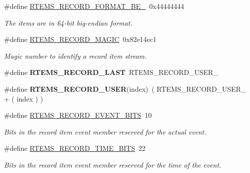 \begin{DoxyCompactItemize}
\mbox{\label{group__RTEMSRecord_ga299229d8ddf07f89328eac448152d11a}} 
\#define \mbox{\hyperlink{group__RTEMSRecord_ga299229d8ddf07f89328eac448152d11a}{R\+T\+E\+M\+S\+\_\+\+R\+E\+C\+O\+R\+D\+\_\+\+F\+O\+R\+M\+A\+T\+\_\+\+B\+E\+\_}}~0x44444444
\begin{DoxyCompactList}\small\item\em The items are in 64-\/bit big-\/endian format. \end{DoxyCompactList}\item 
\#define \mbox{\hyperlink{group__RTEMSRecord_ga6d42a7b92bb26f015d34d5d1a84ebbe5}{R\+T\+E\+M\+S\+\_\+\+R\+E\+C\+O\+R\+D\+\_\+\+M\+A\+G\+IC}}~0x82e14ec1
\begin{DoxyCompactList}\small\item\em Magic number to identify a record item stream. \end{DoxyCompactList}\item 
\mbox{\label{group__RTEMSRecord_ga101d568a23f52cb8dabf7e3744d6ad5e}} 
\#define {\bfseries R\+T\+E\+M\+S\+\_\+\+R\+E\+C\+O\+R\+D\+\_\+\+L\+A\+ST}~R\+T\+E\+M\+S\+\_\+\+R\+E\+C\+O\+R\+D\+\_\+\+U\+S\+E\+R\+\_
\item 
\mbox{\label{group__RTEMSRecord_ga61432a1351e8b62da02ebd52232ab1a3}} 
\#define {\bfseries R\+T\+E\+M\+S\+\_\+\+R\+E\+C\+O\+R\+D\+\_\+\+U\+S\+ER}(index)~( R\+T\+E\+M\+S\+\_\+\+R\+E\+C\+O\+R\+D\+\_\+\+U\+S\+E\+R\+\_ + ( index ) )
\item 
\mbox{\label{group__RTEMSRecord_gabcfd0807c7a68e7c378e9f3c3c08b296}} 
\#define \mbox{\hyperlink{group__RTEMSRecord_gabcfd0807c7a68e7c378e9f3c3c08b296}{R\+T\+E\+M\+S\+\_\+\+R\+E\+C\+O\+R\+D\+\_\+\+E\+V\+E\+N\+T\+\_\+\+B\+I\+TS}}~10
\begin{DoxyCompactList}\small\item\em Bits in the record item event member reserved for the actual event. \end{DoxyCompactList}\item 
\mbox{\label{group__RTEMSRecord_ga6b1b2169dc8fadc6e363ed27a0142537}} 
\#define \mbox{\hyperlink{group__RTEMSRecord_ga6b1b2169dc8fadc6e363ed27a0142537}{R\+T\+E\+M\+S\+\_\+\+R\+E\+C\+O\+R\+D\+\_\+\+T\+I\+M\+E\+\_\+\+B\+I\+TS}}~22
\begin{DoxyCompactList}\small\item\em Bits in the record item event member reserved for the time of the event. \end{DoxyCompactList}\item 

\end{DoxyCompactItemize}
